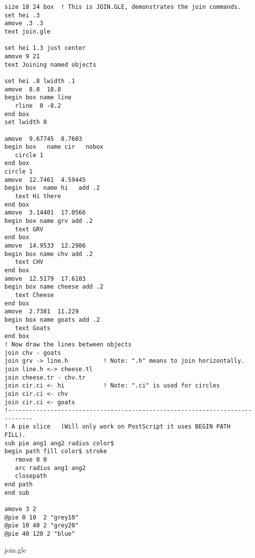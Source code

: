 \clearpage
\begin{center}
\begin{minipage}[t]{12.0cm}
{\scriptsize %
\begin{verbatim}
size 18 24 box	! This is JOIN.GLE, demonstrates the join commands.
set hei .3
amove .3 .3 
text join.gle

set hei 1.3 just center
amove 9 21
text Joining named objects

set hei .8 lwidth .1
amove  8.8  18.8 
begin box name line
   rline  0 -8.2 
end box
set lwidth 0

amove  9.67745  8.7603 
begin box   name cir   nobox
   circle 1
end box
circle 1
amove  12.7461  4.59445 
begin box  name hi   add .2
   text Hi there
end box
amove  3.14401  17.0566 
begin box name grv add .2
   text GRV
end box
amove  14.9533  12.2986 
begin box name chv add .2
   text CHV
end box
amove  12.5179  17.6103 
begin box name cheese add .2
   text Cheese
end box
amove  2.7381  11.229 
begin box name goats add .2
   text Goats
end box
! Now draw the lines between objects
join chv - goats
join grv -> line.h          ! Note: ".h" means to join horizontally.
join line.h <-> cheese.tl
join cheese.tr - chv.tr
join cir.ci <- hi           ! Note: ".ci" is used for circles
join cir.ci <- chv
join cir.ci <- goats
!-----------------------------------------------------------------------------
! A pie slice   (Will only work on PostScript it uses BEGIN PATH FILL).
sub pie ang1 ang2 radius color$
begin path fill color$ stroke
   rmove 0 0
   arc radius ang1 ang2 
   closepath
end path
end sub

amove 3 2
@pie 0 10  2 "grey10"
@pie 10 40 2 "grey20"
@pie 40 120 2 "blue"
\end{verbatim}
}
\hfill {\small join.gle}\\
\end{minipage}

\end{center}
\vfill

